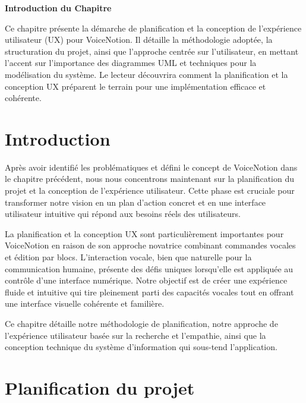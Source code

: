 
\begin{center}
    \textbf{\large Introduction du Chapitre}
    \end{center}
    
        Ce chapitre présente la démarche de planification et la conception de l'expérience utilisateur (UX) pour VoiceNotion. Il détaille la méthodologie adoptée, la structuration du projet, ainsi que l'approche centrée sur l'utilisateur, en mettant l'accent sur l'importance des diagrammes UML et techniques pour la modélisation du système. Le lecteur découvrira comment la planification et la conception UX préparent le terrain pour une implémentation efficace et cohérente.
    
    \section{Introduction}
    
    Après avoir identifié les problématiques et défini le concept de VoiceNotion dans le chapitre précédent, nous nous concentrons maintenant sur la planification du projet et la conception de l'expérience utilisateur. Cette phase est cruciale pour transformer notre vision en un plan d'action concret et en une interface utilisateur intuitive qui répond aux besoins réels des utilisateurs.
    
    La planification et la conception UX sont particulièrement importantes pour VoiceNotion en raison de son approche novatrice combinant commandes vocales et édition par blocs. L'interaction vocale, bien que naturelle pour la communication humaine, présente des défis uniques lorsqu'elle est appliquée au contrôle d'une interface numérique. Notre objectif est de créer une expérience fluide et intuitive qui tire pleinement parti des capacités vocales tout en offrant une interface visuelle cohérente et familière.
    
    Ce chapitre détaille notre méthodologie de planification, notre approche de l'expérience utilisateur basée sur la recherche et l'empathie, ainsi que la conception technique du système d'information qui sous-tend l'application.
    
    \section{Planification du projet}
    
